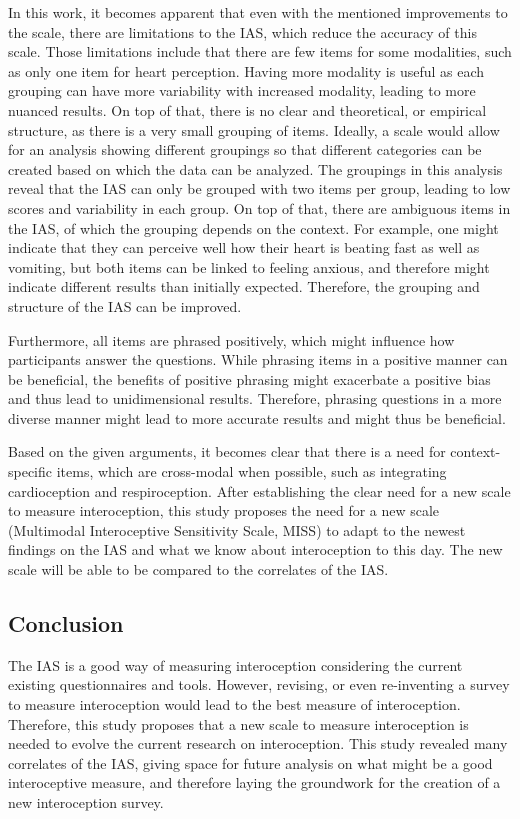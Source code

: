 \documentclass[
  man,
  floatsintext,
  longtable,
  nolmodern,
  notxfonts,
  notimes,
  colorlinks=true,linkcolor=blue,citecolor=blue,urlcolor=blue]{apa7}
\begin{document}
In this work, it becomes apparent that even with the mentioned
improvements to the scale, there are limitations to the IAS, which
reduce the accuracy of this scale. Those limitations include that there
are few items for some modalities, such as only one item for heart
perception. Having more modality is useful as each grouping can have
more variability with increased modality, leading to more nuanced
results. On top of that, there is no clear and theoretical, or empirical
structure, as there is a very small grouping of items. Ideally, a scale
would allow for an analysis showing different groupings so that
different categories can be created based on which the data can be
analyzed. The groupings in this analysis reveal that the IAS can only be
grouped with two items per group, leading to low scores and variability
in each group. On top of that, there are ambiguous items in the IAS, of
which the grouping depends on the context. For example, one might
indicate that they can perceive well how their heart is beating fast as
well as vomiting, but both items can be linked to feeling anxious, and
therefore might indicate different results than initially expected.
Therefore, the grouping and structure of the IAS can be improved.

Furthermore, all items are phrased positively, which might influence how
participants answer the questions. While phrasing items in a positive
manner can be beneficial, the benefits of positive phrasing might
exacerbate a positive bias and thus lead to unidimensional results.
Therefore, phrasing questions in a more diverse manner might lead to
more accurate results and might thus be beneficial.

Based on the given arguments, it becomes clear that there is a need for
context-specific items, which are cross-modal when possible, such as
integrating cardioception and respiroception. After establishing the
clear need for a new scale to measure interoception, this study proposes
the need for a new scale (Multimodal Interoceptive Sensitivity Scale,
MISS) to adapt to the newest findings on the IAS and what we know about
interoception to this day. The new scale will be able to be compared to
the correlates of the IAS.

\subsection{Conclusion}\label{conclusion}

The IAS is a good way of measuring interoception considering the current
existing questionnaires and tools. However, revising, or even
re-inventing a survey to measure interoception would lead to the best
measure of interoception. Therefore, this study proposes that a new
scale to measure interoception is needed to evolve the current research
on interoception. This study revealed many correlates of the IAS, giving
space for future analysis on what might be a good interoceptive measure,
and therefore laying the groundwork for the creation of a new
interoception survey.
\end{document}
